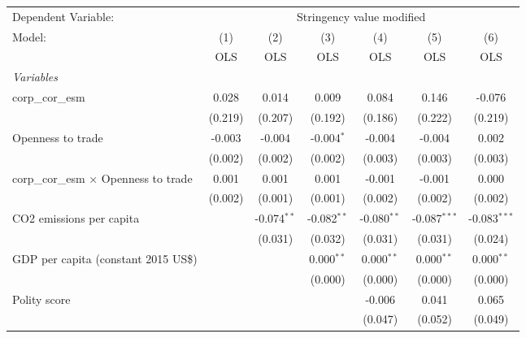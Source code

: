 
\begingroup
\centering
\begin{tabular}{lcccccc}
   \toprule
   Dependent Variable: & \multicolumn{6}{c}{Stringency value modified}\\
   Model:                                       & (1)     & (2)           & (3)           & (4)           & (5)            & (6)\\  
                                                &  OLS    & OLS           & OLS           & OLS           & OLS            & OLS\\  
   \midrule
   \emph{Variables}\\
   corp\_cor\_esm                               & 0.028   & 0.014         & 0.009         & 0.084         & 0.146          & -0.076\\   
                                                & (0.219) & (0.207)       & (0.192)       & (0.186)       & (0.222)        & (0.219)\\   
   Openness to trade                            & -0.003  & -0.004        & -0.004$^{*}$  & -0.004        & -0.004         & 0.002\\   
                                                & (0.002) & (0.002)       & (0.002)       & (0.003)       & (0.003)        & (0.003)\\   
   corp\_cor\_esm $\times$ Openness to trade    & 0.001   & 0.001         & 0.001         & -0.001        & -0.001         & 0.000\\   
                                                & (0.002) & (0.001)       & (0.001)       & (0.002)       & (0.002)        & (0.002)\\   
   CO2 emissions per capita                     &         & -0.074$^{**}$ & -0.082$^{**}$ & -0.080$^{**}$ & -0.087$^{***}$ & -0.083$^{***}$\\   
                                                &         & (0.031)       & (0.032)       & (0.031)       & (0.031)        & (0.024)\\   
   GDP per capita (constant 2015 US\$)          &         &               & 0.000$^{**}$  & 0.000$^{**}$  & 0.000$^{**}$   & 0.000$^{**}$\\   
                                                &         &               & (0.000)       & (0.000)       & (0.000)        & (0.000)\\   
   Polity score                                 &         &               &               & -0.006        & 0.041          & 0.065\\   
                                                &         &               &               & (0.047)       & (0.052)        & (0.049)\\   

\end{tabular}
